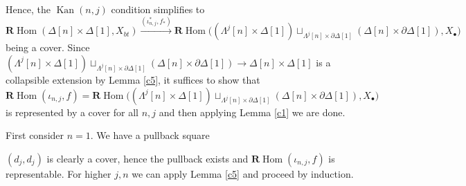 \documentclass[12pt]{amsart}
\theoremstyle{definition}
\theoremstyle{remark}
\numberwithin{equation}{section}
\newcommand{\del}{\partial}
\renewcommand{\del}{\partial}
\newcommand{\BR}{{\mathbf R}}
\newcommand{\1}{{\mathbb{1}}}
\newcommand{\bt}{\bullet}
\newcommand{\Hom}{\operatorname{Hom}}
\newcommand{\kan}{\operatorname{Kan}}
\begin{document}
Hence, the $\kan(n,j)$ condition simplifies to 
\begin{equation*}
   \BR \Hom(\Delta[n]\times \Delta[1], X_{bt}) \stackrel{(\iota^*_{n,j}, f_*)}{\longrightarrow} \BR\Hom\big( (\Lambda^j[n] \times \Delta[1]) \sqcup_{\Lambda^j[n] \times \del\Delta[1] }(\Delta[n] \times \del\Delta[1]), X_{\bt}\big)
\end{equation*}
being a cover. 
 Since $(\Lambda^j[n] \times \Delta[1]) \sqcup_{\Lambda^j[n] \times \del\Delta[1] }(\Delta[n] \times \del\Delta[1])\to \Delta[n]\times \Delta[1]$ is a collapsible extension by Lemma \ref{c5}, it suffices to show that $$ \BR\Hom(\iota_{n,j}, f)=\BR\Hom\big( (\Lambda^j[n] \times \Delta[1]) \sqcup_{\Lambda^j[n] \times \del\Delta[1] }(\Delta[n] \times \del\Delta[1]), X_{\bt}\big)$$ is represented by a cover  for all $n,j$ and then applying Lemma \ref{c1} we are done.
 
 First consider $n = 1$. We have a pullback square
 \begin{center}
\end{center}
$(d_j, d_j)$ is clearly a cover, hence the pullback exists and ${ \BR\Hom(\iota_{n,j}, f)}$ is representable. For higher $j, n$ we can apply Lemma \ref{c5} and proceed by induction.
\end{document}
